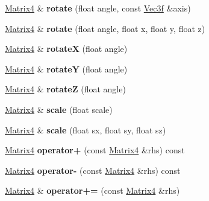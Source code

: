 \begin{DoxyCompactItemize}
\item 
\mbox{\label{class_matrix4_abef349a41e8700adc382057ba5457fd2}} 
\hyperlink{class_matrix4}{Matrix4} \& {\bfseries rotate} (float angle, const \hyperlink{struct_vec3f}{Vec3f} \&axis)
\item 
\mbox{\label{class_matrix4_a34f2e5da0cfd8ddb77579b0c2f1c4255}} 
\hyperlink{class_matrix4}{Matrix4} \& {\bfseries rotate} (float angle, float x, float y, float z)
\item 
\mbox{\label{class_matrix4_a25558cec243bd6d5e94fdc9314f05a9e}} 
\hyperlink{class_matrix4}{Matrix4} \& {\bfseries rotateX} (float angle)
\item 
\mbox{\label{class_matrix4_a8a050af5438b578728b5105ae15f5cfb}} 
\hyperlink{class_matrix4}{Matrix4} \& {\bfseries rotateY} (float angle)
\item 
\mbox{\label{class_matrix4_ace8f7ee2e56fb5316b21bdcaf4491509}} 
\hyperlink{class_matrix4}{Matrix4} \& {\bfseries rotateZ} (float angle)
\item 
\mbox{\label{class_matrix4_acade41d13743c554d79e844f43019c23}} 
\hyperlink{class_matrix4}{Matrix4} \& {\bfseries scale} (float scale)
\item 
\mbox{\label{class_matrix4_a28c20caa1f9dcbc77bae379207028a03}} 
\hyperlink{class_matrix4}{Matrix4} \& {\bfseries scale} (float sx, float sy, float sz)
\item 
\mbox{\label{class_matrix4_a61b8f5a2f89ae56c43b91e750ae6e580}} 
\hyperlink{class_matrix4}{Matrix4} {\bfseries operator+} (const \hyperlink{class_matrix4}{Matrix4} \&rhs) const
\item 
\mbox{\label{class_matrix4_a8ee3db0a15525fa4cdde282f8b94b7df}} 
\hyperlink{class_matrix4}{Matrix4} {\bfseries operator-\/} (const \hyperlink{class_matrix4}{Matrix4} \&rhs) const
\item 
\mbox{\label{class_matrix4_aa25858af1530f2c1101349e10cb5ab0d}} 
\hyperlink{class_matrix4}{Matrix4} \& {\bfseries operator+=} (const \hyperlink{class_matrix4}{Matrix4} \&rhs)

\end{DoxyCompactItemize}
